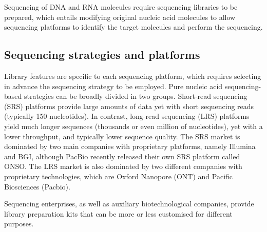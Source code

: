 \documentclass[
]{book}
\begin{document}
Sequencing of DNA and RNA molecules require sequencing libraries to be prepared, which entails modifying original nucleic acid molecules to allow sequencing platforms to identify the target molecules and perform the sequencing.

\hypertarget{sequencing-strategies-platforms}{%
\subsection*{Sequencing strategies and platforms}\label{sequencing-strategies-platforms}}

Library features are specific to each sequencing platform, which requires selecting in advance the sequencing strategy to be employed. Pure nucleic acid sequencing-based strategies can be broadly divided in two groups. Short-read sequencing (SRS) platforms provide large amounts of data yet with short sequencing reads (typically 150 nucleotides). In contrast, long-read sequencing (LRS) platforms yield much longer sequences (thousands or even million of nucleotides), yet with a lower throughput, and typically lower sequence quality. The SRS market is dominated by two main companies with proprietary platforms, namely Illumina and BGI, although PacBio recently released their own SRS platform called ONSO. The LRS market is also dominated by two different companies with proprietary technologies, which are Oxford Nanopore (ONT) and Pacific Biosciences (Pacbio).

Sequencing enterprises, as well as auxiliary biotechnological companies, provide library preparation kits that can be more or less customised for different purposes.
\end{document}
